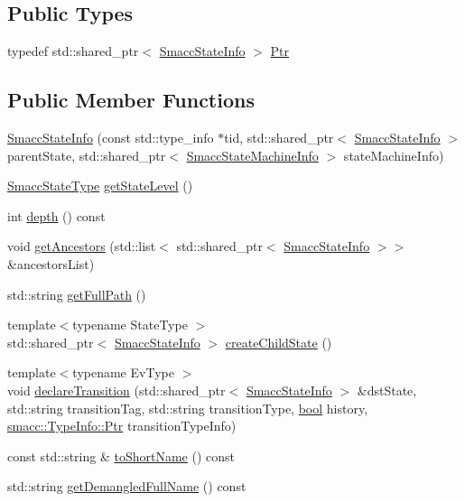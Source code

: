\subsection*{Public Types}
\begin{DoxyCompactItemize}
\item 
typedef std\+::shared\+\_\+ptr$<$ \hyperlink{classsmacc_1_1SmaccStateInfo}{Smacc\+State\+Info} $>$ \hyperlink{classsmacc_1_1SmaccStateInfo_a25245e3ff2ffe691f365875f8004ce4d}{Ptr}
\end{DoxyCompactItemize}
\subsection*{Public Member Functions}
\begin{DoxyCompactItemize}
\item 
\hyperlink{classsmacc_1_1SmaccStateInfo_a262bc6242d8a3b2c29c34b4cf325dfb4}{Smacc\+State\+Info} (const std\+::type\+\_\+info $\ast$tid, std\+::shared\+\_\+ptr$<$ \hyperlink{classsmacc_1_1SmaccStateInfo}{Smacc\+State\+Info} $>$ parent\+State, std\+::shared\+\_\+ptr$<$ \hyperlink{classsmacc_1_1SmaccStateMachineInfo}{Smacc\+State\+Machine\+Info} $>$ state\+Machine\+Info)
\item 
\hyperlink{namespacesmacc_a63f5f7aae7e563619d0886fca83612cc}{Smacc\+State\+Type} \hyperlink{classsmacc_1_1SmaccStateInfo_a360141a4883f0122a9f5e8b7de456084}{get\+State\+Level} ()
\item 
int \hyperlink{classsmacc_1_1SmaccStateInfo_a2abede9fd08d8954c3e392a053d50533}{depth} () const 
\item 
void \hyperlink{classsmacc_1_1SmaccStateInfo_aca52fb4c1c3f5f35e3292bd7d6d6c66d}{get\+Ancestors} (std\+::list$<$ std\+::shared\+\_\+ptr$<$ \hyperlink{classsmacc_1_1SmaccStateInfo}{Smacc\+State\+Info} $>$$>$ \&ancestors\+List)
\item 
std\+::string \hyperlink{classsmacc_1_1SmaccStateInfo_a22e625806a74808ee272df5c034d122e}{get\+Full\+Path} ()
\item 
{\footnotesize template$<$typename State\+Type $>$ }\\std\+::shared\+\_\+ptr$<$ \hyperlink{classsmacc_1_1SmaccStateInfo}{Smacc\+State\+Info} $>$ \hyperlink{classsmacc_1_1SmaccStateInfo_a1c935c77640d496f22f5f48d78ddb296}{create\+Child\+State} ()
\item 
{\footnotesize template$<$typename Ev\+Type $>$ }\\void \hyperlink{classsmacc_1_1SmaccStateInfo_a3f8166e666014cce41b2c076abfaebac}{declare\+Transition} (std\+::shared\+\_\+ptr$<$ \hyperlink{classsmacc_1_1SmaccStateInfo}{Smacc\+State\+Info} $>$ \&dst\+State, std\+::string transition\+Tag, std\+::string transition\+Type, \hyperlink{classbool}{bool} history, \hyperlink{classsmacc_1_1TypeInfo_aca0cd51c7c9ef85f6c98dc32878af226}{smacc\+::\+Type\+Info\+::\+Ptr} transition\+Type\+Info)
\item 
const std\+::string \& \hyperlink{classsmacc_1_1SmaccStateInfo_aa43c3733427618a141c3f6803913a88b}{to\+Short\+Name} () const 
\item 
std\+::string \hyperlink{classsmacc_1_1SmaccStateInfo_a84e7951d11da45516080103959b88c17}{get\+Demangled\+Full\+Name} () const 
\end{DoxyCompactItemize}
